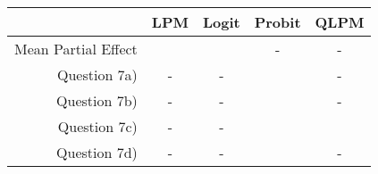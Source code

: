 \begin{tabular}{rcccc}
	& LPM & Logit & Probit & QLPM \\\hline
	\hline
	Mean Partial Effect &  &  & - & -\\
	Question 7a) & - & - &  & - \\
	Question 7b) & - & - &  & - \\
	Question 7c) & - & - &  &  \\
	Question 7d) & - & - &  & - \\
\end{tabular}